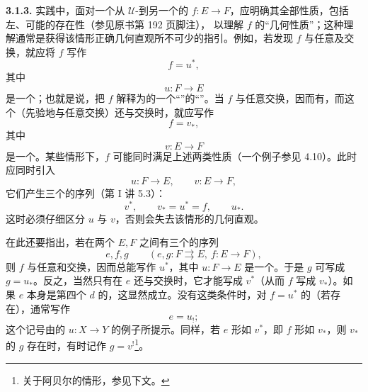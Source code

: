 \textbf{3.1.3.} 实践中，面对一个从 $\mathcal U$-到另一个的 $f:E\to F$，应明确其全部性质，包括左、可能的存在性（参见原书第 192 页脚注），
以理解 $f$ 的“几何性质”；这种理解通常是获得该情形正确几何直观所不可少的指引。例如，若发现 $f$ 与任意及交换，就应将 $f$ 写作
\[
 f=u^*,
\]
其中
\[
 u:F\longrightarrow E
\]
是一个；也就是说，把 $f$ 解释为的一个“”的“”。当 $f$ 与任意交换，因而有，而这个（先验地与任意交换）还与交换时，就应写作
\[
 f=v_*,
\]
其中
\[
 v:E\longrightarrow F
\]
是一个。某些情形下，$f$ 可能同时满足上述两类性质（一个例子参见 4.10）。此时应同时引入
\[
 u:F\longrightarrow E,\qquad v:E\longrightarrow F,
\]
它们产生三个的序列（第 I 讲 5.3）：
\[
 v^*,\qquad v_*=u^*=f,\qquad u_*.
\]
这时必须仔细区分 $u$ 与 $v$，否则会失去该情形的几何直观。

在此还要指出，若在两个 $E,F$ 之间有三个的序列
\[
 e,f,g\qquad(e,g:F\rightrightarrows E,\ f:E\to F),
\]
则 $f$ 与任意和交换，因而总能写作 $u^*$，其中 $u:F\to E$ 是一个。于是 $g$ 可写成 $g=u_*$。反之，当然只有在 $e$ 还与交换时，它才能写成 $v^*$（从而 $f$ 写成 $v_*$）。如果 $e$ 本身是第四个 $d$ 的，这显然成立。没有这类条件时，对 $f=u^*$ 的（若存在），通常写作
\[
 e=u_!;
\]
这个记号由的 $u:X\to Y$ 的例子所提示。同样，若 $e$ 形如 $v^*$，即 $f$ 形如
$v_*$，则 $v_*$ 的 $g$ 存在时，有时记作 $g=v^!$\footnote{关于阿贝尔的情形，参见下文。}。

